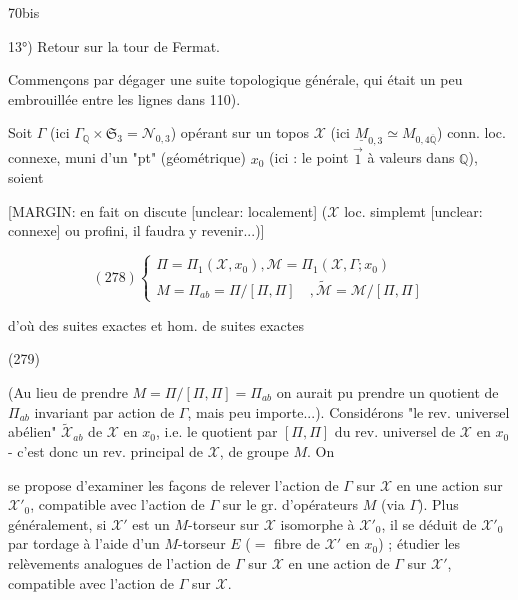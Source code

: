 \newpage


70bis

13°) Retour sur la tour de Fermat.

Commençons par dégager une suite topologique générale, qui était un peu embrouillée entre les lignes dans 110).

Soit $\Gamma$ (ici $\Gamma_{\mathbb{Q}} \times \mathfrak{S}_3 = \mathcal{N}_{0,3}$) opérant sur un topos $\mathcal{X}$ (ici $\underline{M}_{0,3} \simeq M_{0,4 \overline{\mathbb{Q}}}$) conn. loc. connexe, muni d'un "pt" (géométrique) $x_0$ (ici : le point $\vec{1}$ à valeurs dans $\mathbb{Q}$), soient

[MARGIN: en fait on discute [unclear: localement] ($\mathcal{X}$ loc. simplemt [unclear: connexe] ou profini, il faudra y revenir...)]

$$ (278) \begin{cases} \Pi = \Pi_1(\mathcal{X}, x_0), \mathcal{M} = \Pi_1(\mathcal{X}, \Gamma; x_0) \\ M = \Pi_{ab} = \Pi/[\Pi,\Pi] \quad, \tilde{\mathcal{M}} = \mathcal{M}/[\Pi,\Pi] \end{cases} $$

d'où des suites exactes et hom. de suites exactes

(279)

(Au lieu de prendre $M = \Pi/[\Pi,\Pi] = \Pi_{ab}$ on aurait pu prendre un quotient de $\Pi_{ab}$ invariant par action de $\Gamma$, mais peu importe...). Considérons "le rev. universel abélien" $\tilde{\mathcal{X}}_{ab}$ de $\mathcal{X}$ en $x_0$, i.e. le quotient par $[\Pi,\Pi]$ du rev. universel de $\mathcal{X}$ en $x_0$ - c'est donc un rev. principal de $\mathcal{X}$, de groupe $M$. On

\newpage


se propose d'examiner les façons de relever l'action de $\Gamma$ sur $\mathcal{X}$ en une action sur $\mathcal{X}'_0$, compatible avec l'action de $\Gamma$ sur le gr. d'opérateurs $M$ (via $\Gamma$). Plus généralement, si $\mathcal{X}'$ est un $M$-torseur sur $\mathcal{X}$ isomorphe à $\mathcal{X}'_0$, il se déduit de $\mathcal{X}'_0$ par tordage à l'aide d'un $M$-torseur $E$ ($=$ fibre de $\mathcal{X}'$ en $x_0$) ; étudier les relèvements analogues de l'action de $\Gamma$ sur $\mathcal{X}$ en une action de $\Gamma$ sur $\mathcal{X}'$, compatible avec l'action de $\Gamma$ sur $\mathcal{X}$.

